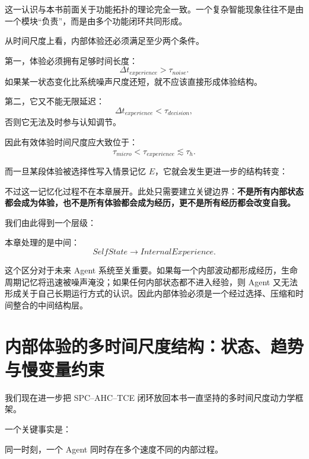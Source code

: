 这一认识与本书前面关于功能拓扑的理论完全一致。一个复杂智能现象往往不是由一个模块``负责''，而是由多个功能闭环共同形成。

从时间尺度上看，内部体验还必须满足至少两个条件。

第一，体验必须拥有足够时间长度：
\[
\Delta t_{experience}
>
\tau_{noise}.
\]
如果某一状态变化比系统噪声尺度还短，就不应该直接形成体验结构。

第二，它又不能无限延迟：
\[
\Delta t_{experience}
<
\tau_{decision},
\]
否则它无法及时参与认知调节。

因此有效体验时间尺度应大致位于：
\[
\boxed{
\tau_{micro}
<
\tau_{experience}
\lesssim
\tau_h.
}
\]

而一旦某段体验被选择性写入情景记忆 $E$，它就会发生更进一步的结构转变：
\begin{statementbox}
\centering
{}
\end{statementbox}
不过这一记忆化过程不在本章展开。此处只需要建立关键边界：\textbf{不是所有内部状态都会成为体验，也不是所有体验都会成为经历，更不是所有经历都会改变自我。}

我们由此得到一个层级：
\begin{statementbox}
\centering
{}
\end{statementbox}
本章处理的是中间：
\[
SelfState\rightarrow InternalExperience.
\]

这个区分对于未来 Agent 系统至关重要。如果每一个内部波动都形成经历，生命周期记忆将迅速被噪声淹没；如果任何内部状态都不进入经验，则 Agent 又无法形成关于自己长期运行方式的认识。因此内部体验必须是一个经过选择、压缩和时间整合的中间结构层。

\section{内部体验的多时间尺度结构：状态、趋势与慢变量约束}

我们现在进一步把 SPC--AHC--TCE 闭环放回本书一直坚持的多时间尺度动力学框架。

一个关键事实是：
\begin{statementbox}
\centering
{}
\end{statementbox}

同一时刻，一个 Agent 同时存在多个速度不同的内部过程。

